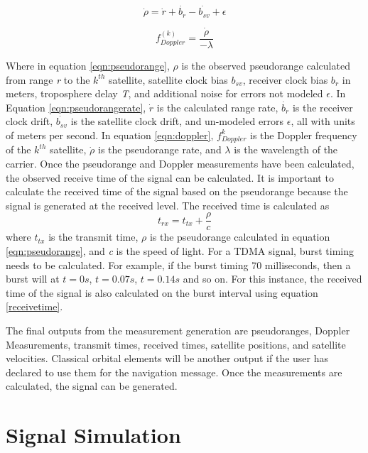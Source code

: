 \documentclass[12pt]{report}
\begin{document}
\begin{equation}
    \dot{\rho} = \dot{r} + \dot{b_r} - \dot{b_{sv}} + \epsilon
    \label{eqn:pseudorangerate}
\end{equation}

\begin{equation}
    f^{(k)}_{Doppler} = \frac{\dot{\rho}}{-\lambda}
    \label{eqn:doppler}
\end{equation}


Where in equation \ref{eqn:pseudorange}, $\rho$ is the observed pseudorange calculated from range \textit{r} to the $k^{th}$ satellite, satellite clock bias $b_{sv}$, receiver clock bias $b_{r}$ in meters, troposphere delay \textit{T},  and additional noise for errors not modeled $\epsilon$. In Equation \ref{eqn:pseudorangerate}, $\dot{r}$ is the calculated range rate, $\dot{b_r}$ is the receiver clock drift, $\dot{b_{sv}}$ is the satellite clock drift, and un-modeled errors $\epsilon$, all with units of meters per second. In equation \ref{eqn:doppler}, $f^{k}_{Doppler}$ is the Doppler frequency of the $k^{th}$ satellite, $\dot{\rho}$ is the pseudorange rate, and $\lambda$ is the wavelength of the carrier. Once the pseudorange and Doppler measurements have been calculated, the observed receive time of the signal can be calculated. It is important to calculate the received time of the signal based on the pseudorange because the signal is generated at the received level. The received time is calculated as 
\begin{equation}
    t_{rx} = t_{tx} + \frac{\rho}{c}
    \label{receivetime}
\end{equation}
where $t_{tx}$ is the transmit time, $\rho$ is the pseudorange calculated in equation \ref{eqn:pseudorange}, and \textit{c} is the speed of light. For a TDMA signal, burst timing needs to be calculated. For example, if the burst timing 70 milliseconds, then a burst will at $t=0s$, $t=0.07s$, $t=0.14s$ and so on. For this instance, the received time of the signal is also calculated on the burst interval using equation \ref{receivetime}.

The final outputs from the measurement generation are pseudoranges, Doppler Measurements, transmit times, received times, satellite positions, and satellite velocities. Classical orbital elements will be another output if the user has declared to use them for the navigation message. Once the measurements are calculated, the signal can be generated.

\section{Signal Simulation}
\end{document}
